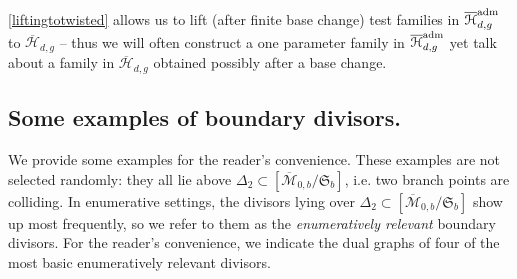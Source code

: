 \documentclass[reqno, 10 pt]{article}
\theoremstyle{definition}
\theoremstyle{remark}
\numberwithin{equation}{section}
\numberwithin{thm}{section}
\numberwithin{prop}{section}
\numberwithin{lem}{section}
\numberwithin{cor}{section}
\numberwithin{conj}{section}
\numberwithin{defn}{section}
\newcommand{\M}{\mathcal M}
\renewcommand{\H}{\mathcal H}
\newcommand{\Hdg}{\overline{\H}_{d,g}}
\renewcommand{\H}{{\mathcal{H}}}
\begin{document}
  \autoref{liftingtotwisted} allows us to lift (after finite base change) test families in  $\overline{\H}_{d,g}^{\rm{adm}}$ to $\overline{\H}_{d,g}$ -- thus we will often construct a one parameter family in $\overline{\H}_{d,g}^{\rm{adm}}$ yet talk about a family in $\Hdg$ obtained possibly after a base change. 

\subsection{Some examples of boundary divisors.}

  We provide some examples for the reader's convenience.  These examples are not selected randomly: they all lie above $\Delta_2 \subset  [\overline{\M}_{0,b}/\mathfrak{S}_{b}]$, i.e. two branch points are colliding.  In enumerative settings, the  divisors lying over $\Delta_{2} \subset   [\overline{\M}_{0,b}/\mathfrak{S}_{b}]$ show up most frequently, so we refer to them as the {\sl enumeratively relevant}  boundary divisors. For the reader's convenience, we indicate the dual graphs of four of the most basic enumeratively relevant divisors.
\end{document}
